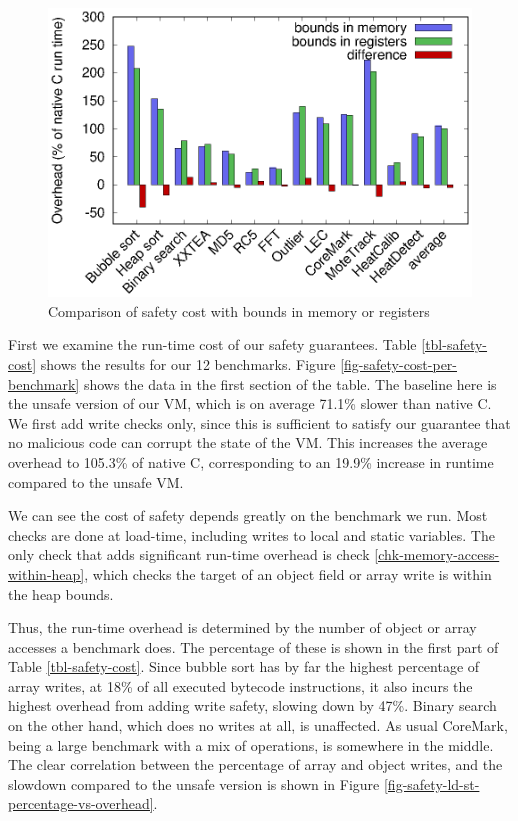 \begin{figure}[]
   \centering
  \includegraphics[width=0.6\linewidth]{safety-cost-diff-using-regs.eps}
  \caption{Comparison of safety cost with bounds in memory or registers}
  \label{fig-safety-cost-memory-or-registers}
\end{figure}

First we examine the run-time cost of our safety guarantees. Table \ref{tbl-safety-cost} shows the results for our 12 benchmarks. Figure \ref{fig-safety-cost-per-benchmark} shows the data in the first section of the table. The baseline here is the unsafe version of our VM, which is on average 71.1\% slower than native C. We first add write checks only, since this is sufficient to satisfy our guarantee that no malicious code can corrupt the state of the VM. This increases the average overhead to 105.3\% of native C, corresponding to an 19.9\% increase in runtime compared to the unsafe VM.

We can see the cost of safety depends greatly on the benchmark we run. Most checks are done at load-time, including writes to local and static variables. The only check that adds significant run-time overhead is check \ref{chk-memory-access-within-heap}, which checks the target of an object field or array write is within the heap bounds.

Thus, the run-time overhead is determined by the number of object or array accesses a benchmark does. The percentage of these is shown in the first part of Table \ref{tbl-safety-cost}. Since bubble sort has by far the highest percentage of array writes, at 18\% of all executed bytecode instructions, it also incurs the highest overhead from adding write safety, slowing down by 47\%. Binary search on the other hand, which does no writes at all, is unaffected. As usual CoreMark, being a large benchmark with a mix of operations, is somewhere in the middle. The clear correlation between the percentage of array and object writes, and the slowdown compared to the unsafe version is shown in Figure \ref{fig-safety-ld-st-percentage-vs-overhead}.

